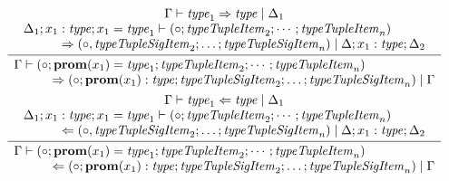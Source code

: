 \begin{gather*}
  \infer{
    \begin{array}{l}
      \Gamma \vdash (\circ; \mathbf{prom}(x_1) = \mathit{type}_1; \mathit{typeTupleItem}_2; \cdots; \mathit{typeTupleItem}_n)
      \\
      \hspace{3em}\Rightarrow (\circ; \mathbf{prom}(x_1): \mathit{type}; \mathit{typeTupleSigItem}_2; \ldots; \mathit{typeTupleSigItem}_n) \mid \Gamma
    \end{array}
  }{
    \begin{array}{c}
      \Gamma \vdash \mathit{type}_1 \Rightarrow \mathit{type} \mid \Delta_1
      \\
      \begin{array}{l}
        \Delta_1; x_1: \mathit{type}; x_1 = \mathit{type}_1 \vdash (\circ; \mathit{typeTupleItem}_2; \cdots; \mathit{typeTupleItem}_n)
        \\
        \hspace{3em}\Rightarrow (\circ, \mathit{typeTupleSigItem}_2; \ldots; \mathit{typeTupleSigItem}_n) \mid \Delta; x_1: \mathit{type}; \Delta_2
      \end{array}
    \end{array}
  }
  \\
  \infer{
    \begin{array}{l}
      \Gamma \vdash (\circ; \mathbf{prom}(x_1) = \mathit{type}_1; \mathit{typeTupleItem}_2; \cdots; \mathit{typeTupleItem}_n)
      \\
      \hspace{3em}\Leftarrow (\circ; \mathbf{prom}(x_1): \mathit{type}; \mathit{typeTupleSigItem}_2; \ldots; \mathit{typeTupleSigItem}_n) \mid \Gamma
    \end{array}
  }{
    \begin{array}{c}
      \Gamma \vdash \mathit{type}_1 \Leftarrow \mathit{type} \mid \Delta_1
      \\
      \begin{array}{l}
        \Delta_1; x_1: \mathit{type}; x_1 = \mathit{type}_1 \vdash (\circ; \mathit{typeTupleItem}_2; \cdots; \mathit{typeTupleItem}_n)
        \\
        \hspace{3em}\Leftarrow (\circ, \mathit{typeTupleSigItem}_2; \ldots; \mathit{typeTupleSigItem}_n) \mid \Delta; x_1: \mathit{type}; \Delta_2
      \end{array}
    \end{array}
  }
\end{gather*}

